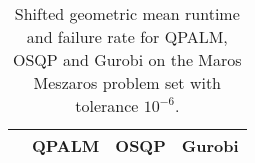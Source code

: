 \documentclass{amsart}
\begin{document}
\begin{table}
	\centering
	\begin{tabular}{l|ccc}
		& QPALM & OSQP & Gurobi \\ \hline
		
	\end{tabular}
	\caption{\small Shifted geometric mean runtime and failure rate for QPALM, OSQP and Gurobi on the Maros Meszaros problem set with tolerance \(10^{-6}\).}
	
\end{table}
\end{document}
